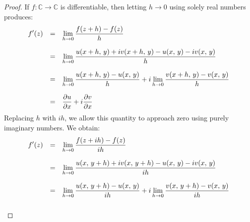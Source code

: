 \documentclass{article}
\theoremstyle{definition}
\begin{document}
        \begin{proof}
            If $f:\mathbb{C}\rightarrow\mathbb{C}$ is differentiable,
            then letting $h\rightarrow{0}$ using solely real numbers produces:
            \begin{equation}
                \begin{array}{rcl}
                    \displaystyle
                    f^{\prime}(z)
                    &=&
                    \displaystyle
                    \lim_{h\rightarrow{0}}
                    \frac{f(z+h)-f(z)}{h}\\[1.5em]
                    \displaystyle
                    &=&
                    \displaystyle
                    \lim_{h\rightarrow{0}}
                    \frac{u(x+h,\,y)+iv(x+h,\,y)-u(x,\,y)-iv(x,\,y)}{h}\\[1.5em]
                    \displaystyle
                    &=&
                    \displaystyle
                    \lim_{h\rightarrow{0}}
                    \frac{u(x+h,\,y)-u(x,\,y)}{h}
                    +i\lim_{h\rightarrow{0}}
                        \frac{v(x+h,\,y)-v(x,\,y)}{h}\\[1.5em]
                    &=&
                    \displaystyle
                    \frac{\partial{u}}{\partial{x}}
                        +i\frac{\partial{v}}{\partial{x}}
                \end{array}
            \end{equation}
            Replacing $h$ with $ih$, we allow this quantity to approach zero
            using purely imaginary numbers. We obtain:
            \begin{equation}
                \begin{array}{rcl}
                    \displaystyle
                    f^{\prime}(z)
                    &=&
                    \displaystyle
                    \lim_{h\rightarrow{0}}
                    \frac{f(z+ih)-f(z)}{ih}\\[1.5em]
                    \displaystyle
                    &=&
                    \displaystyle
                    \lim_{h\rightarrow{0}}
                    \frac{u(x,\,y+h)+iv(x,\,y+h)-u(x,\,y)-iv(x,\,y)}{ih}\\[1.5em]
                    \displaystyle
                    &=&
                    \displaystyle
                    \lim_{h\rightarrow{0}}
                    \frac{u(x,\,y+h)-u(x,\,y)}{ih}
                    +i\lim_{h\rightarrow{0}}
                        \frac{v(x,\,y+h)-v(x,\,y)}{ih}\\[1.5em]

\end{array}
\end{equation}
\end{proof}
\end{document}
